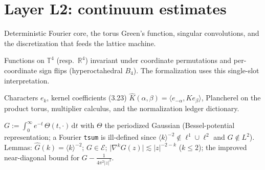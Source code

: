 \chapter{Layer L2: continuum estimates}\label{ch:continuum}

Deterministic Fourier core, the torus Green's function, singular
convolutions, and the discretization that feeds the lattice machine.

\begin{definition}\label{D-E}
  \leanok
  Functions on \(\mathbb{T}^4\) (resp.\ \(\mathbb{R}^4\)) invariant under
  coordinate permutations and per-coordinate sign flips (hyperoctahedral
  \(B_4\)). The formalization uses this single-slot interpretation.
\end{definition}

\begin{definition}\label{I-torus}
  \leanok
  Characters \(e_k\), kernel coefficients (3.23)
  \(\widehat K(\alpha,\beta) = \langle e_{-\alpha}, K e_\beta\rangle\),
  Plancherel on the product torus, multiplier calculus, and the
  normalization ledger dictionary.
\end{definition}

\begin{definition}\label{I-green}
  \leanok
  \(G := \int_0^\infty e^{-t}\,\Theta(t,\cdot)\,\mathrm{d}t\) with
  \(\Theta\) the periodized Gaussian (Bessel-potential representation;
  a Fourier \texttt{tsum} is ill-defined since
  \(\langle k\rangle^{-2}\notin\ell^1\cup\ell^2\) and
  \(G \notin L^2\)). Lemmas: \(\widehat G(k) = \langle k\rangle^{-2}\);
  \(G \in \mathcal{E}\); \(\lvert\nabla^k G(z)\rvert \lesssim
  \lvert z\rvert^{-2-k}\) (\(k \le 2\)); the improved near-diagonal bound
  for \(G - \frac{1}{4\pi^2\lvert z\rvert^2}\).
\end{definition}

